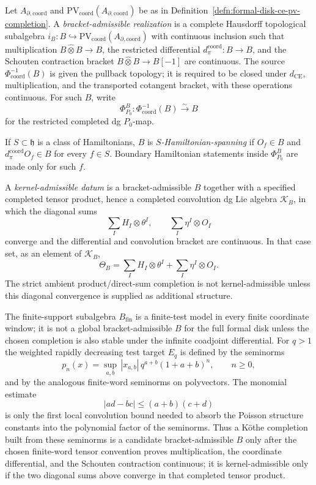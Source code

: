 \begin{defn}\label{defn:bracket-kernel-admissible}
  Let \(A_{\partial,\mathrm{coord}}\) and
  \(\mathrm{PV}_{\mathrm{coord}}(A_{\partial,\mathrm{coord}})\) be as in
  Definition~\ref{defn:formal-disk-ce-pv-completion}.  A
  \emph{bracket-admissible realization} is a complete Hausdorff
  topological subalgebra
  \(i_B\colon B\hookrightarrow
  \mathrm{PV}_{\mathrm{coord}}(A_{\partial,\mathrm{coord}})\) with
  continuous inclusion such that multiplication
  \(B\widehat\otimes B\to B\), the restricted differential
  \(d_\pi^{\mathrm{coord}}\colon B\to B\), and the Schouten contraction
  bracket \(B\widehat\otimes B\to B[-1]\) are continuous.  The source
  \(\Phi_{\mathrm{coord}}^{-1}(B)\) is given the pullback topology; it is
  required to be closed under \(d_{\mathrm{CE}}\), multiplication, and the
  transported cotangent bracket, with these operations continuous.  For
  such \(B\), write
  \[
    \Phi^B_{P_0}\colon
    \Phi_{\mathrm{coord}}^{-1}(B)\xrightarrow{\sim}B
  \]
  for the restricted completed dg \(P_0\)-map.

  If \(S\subset\mathfrak h\) is a class of Hamiltonians, \(B\) is
  \emph{\(S\)-Hamiltonian-spanning} if \(O_f\in B\) and
  \(d_\pi^{\mathrm{coord}}O_f\in B\) for every \(f\in S\).  Boundary
  Hamiltonian statements inside \(\Phi^B_{P_0}\) are made only for such
  \(f\).

  A \emph{kernel-admissible datum} is a bracket-admissible \(B\) together
  with a specified completed tensor product, hence a completed
  convolution dg Lie algebra \(\mathcal K_B\), in which the diagonal sums
  \[
    \sum_I H_I\otimes\theta^I,\qquad
    \sum_I \eta^I\otimes O_I
  \]
  converge and the differential and convolution bracket are continuous.
  In that case set, as an element of \(\mathcal K_B\),
  \[
    \Theta_B=\sum_I H_I\otimes\theta^I+\sum_I\eta^I\otimes O_I .
  \]
  The strict ambient product/direct-sum completion is not
  kernel-admissible unless this diagonal convergence is supplied as
  additional structure.

	  The finite-support subalgebra \(B_{\mathrm{fin}}\) is a finite-test
	  model in every finite coordinate window; it is not a global
	  bracket-admissible \(B\) for the full formal disk unless the chosen
	  completion is also stable under the infinite coadjoint differential.
	  For \(q>1\) the weighted rapidly decreasing test target \(E_q\) is defined by the
	  seminorms
  \[
    p_n(x)=
    \sup_{a,b}\,|x_{a,b}|\,q^{a+b}(1+a+b)^n,\qquad n\geq0,
  \]
  and by the analogous finite-word seminorms on polyvectors.  The
	  monomial estimate
  \[
    |ad-bc|\leq (a+b)(c+d)
  \]
	  is only the first local convolution bound needed to absorb the
	  Poisson structure constants into the polynomial factor of the
	  seminorms.  Thus a Köthe completion built from these seminorms is a
	  candidate bracket-admissible \(B\) only after the chosen finite-word
	  tensor convention proves multiplication, the coordinate differential,
	  and the Schouten contraction continuous; it is kernel-admissible only
	  if the two diagonal sums above converge in that completed tensor
	  product.
\end{defn}

